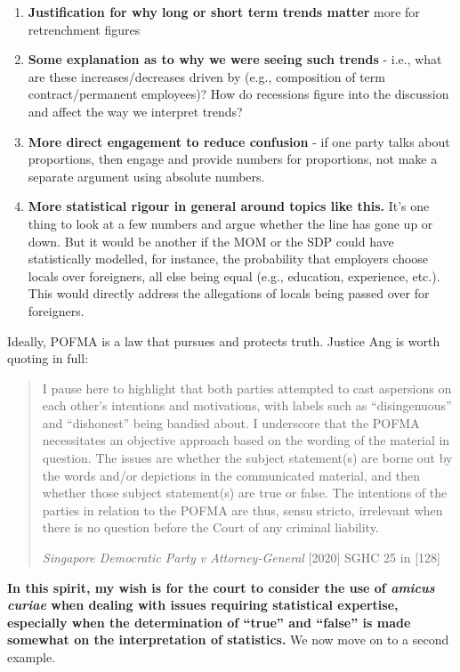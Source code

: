 \documentclass[openany]{book}
\providecommand{\tightlist}{%
  \setlength{\itemsep}{0pt}\setlength{\parskip}{0pt}}
\begin{document}
\begin{enumerate}
\def\labelenumi{\arabic{enumi}.}
\tightlist
\item
  \textbf{Justification for why long or short term trends matter} more
  for retrenchment figures
\item
  \textbf{Some explanation as to why we were seeing such trends} - i.e.,
  what are these increases/decreases driven by (e.g., composition of
  term contract/permanent employees)? How do recessions figure into the
  discussion and affect the way we interpret trends?
\item
  \textbf{More direct engagement to reduce confusion} - if one party
  talks about proportions, then engage and provide numbers for
  proportions, not make a separate argument using absolute numbers.
\item
  \textbf{More statistical rigour in general around topics like this.}
  It's one thing to look at a few numbers and argue whether the line has
  gone up or down. But it would be another if the MOM or the SDP could
  have statistically modelled, for instance, the probability that
  employers choose locals over foreigners, all else being equal (e.g.,
  education, experience, etc.). This would directly address the
  allegations of locals being passed over for foreigners.
\end{enumerate}

Ideally, POFMA is a law that pursues and protects truth. Justice Ang is
worth quoting in full:

\begin{quote}
I pause here to highlight that both parties attempted to cast aspersions
on each other's intentions and motivations, with labels such as
``disingenuous'' and ``dishonest'' being bandied about. I underscore
that the POFMA necessitates an objective approach based on the wording
of the material in question. The issues are whether the subject
statement(s) are borne out by the words and/or depictions in the
communicated material, and then whether those subject statement(s) are
true or false. The intentions of the parties in relation to the POFMA
are thus, sensu stricto, irrelevant when there is no question before the
Court of any criminal liability.

\emph{Singapore Democratic Party v Attorney-General} {[}2020{]} SGHC 25
in {[}128{]}
\end{quote}

\textbf{In this spirit, my wish is for the court to consider the use of
\emph{amicus curiae} when dealing with issues requiring statistical
expertise, especially when the determination of ``true'' and ``false''
is made somewhat on the interpretation of statistics.} We now move on to
a second example.
\end{document}
